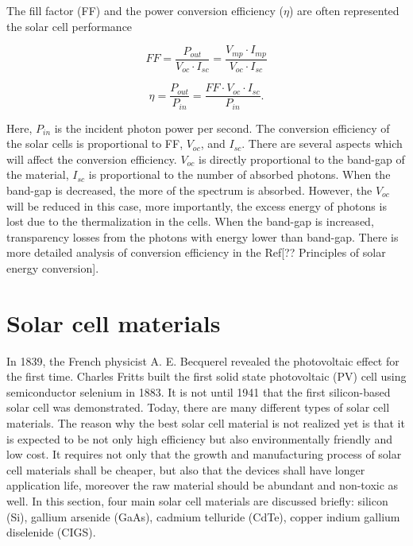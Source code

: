 \documentclass[a4paper, 12pt, titlepage,oneside,drop]{kthesis}
\begin{document}
The fill factor (FF) and the power conversion efficiency ($\eta$) are often represented the solar cell performance

\begin{equation}
FF = \frac{P_{out}}{V_{oc} \cdot I_{sc}} = \frac{V_{mp} \cdot I_{mp}}{V_{oc} \cdot I_{sc}}
\end{equation}

\begin{equation}
\eta = \frac{P_{out}}{P_{in}} = \frac{FF \cdot V_{oc} \cdot I_{sc}}{P_{in}}.
\end{equation}

Here, $P_{in}$ is the incident photon power per second. The conversion efficiency of the solar cells is proportional to FF, $V_{oc}$, and $I_{sc}$. There are several aspects which will affect
the conversion efficiency. $V_{oc}$ is directly proportional to the band-gap of the material, $I_{sc}$ is proportional to the number of absorbed photons. When the band-gap is decreased, the more of the spectrum is absorbed. However, 
the $V_{oc}$ will be reduced in this case, more importantly, the excess energy of photons is lost due to the thermalization in the cells. When the band-gap is increased, transparency losses from the photons with energy lower than
band-gap. There is more detailed analysis of conversion efficiency in the Ref[?? Principles of solar energy conversion].


\section{Solar cell materials}

In 1839,  the French physicist A. E. Becquerel revealed the photovoltaic effect for the first time. Charles Fritts built the first solid state photovoltaic (PV) cell using semiconductor selenium in 1883. It is not until 1941 that
the first silicon-based solar cell was demonstrated. Today, there are many different types of solar cell materials. The reason why the best solar cell material is not realized yet is that it is expected to be not only high efficiency but 
also environmentally friendly and low cost. It requires not only that the growth and manufacturing process of solar cell materials shall be cheaper, but also that the devices shall have longer application life, moreover the raw material
should be abundant and non-toxic as well. In this section, four main solar cell materials are discussed briefly: silicon (Si), gallium arsenide (GaAs), cadmium telluride (CdTe), copper indium gallium diselenide (CIGS).
\end{document}
